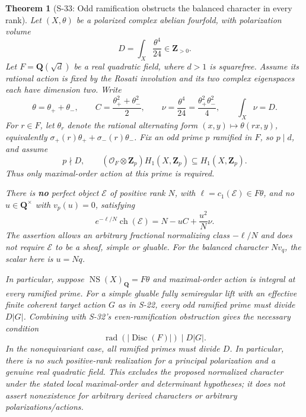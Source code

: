 \documentclass[11pt,a4paper]{article}
\newtheorem{theorem}{Theorem}[section]
\theoremstyle{definition}
\begin{document}
\begin{theorem}[S-33: Odd ramification obstructs the balanced character in every rank]
\label{thm:semireg-odd-ramification}
Let \((X,\theta)\) be a polarized complex abelian fourfold, with polarization volume \[
 D=\int_X\frac{\theta^4}{24}\in\mathbf Z_{>0}.
\] Let \(F=\mathbf Q(\sqrt d)\) be a real quadratic field, where \(d>1\) is squarefree. Assume its rational action is fixed by the Rosati involution and its two complex eigenspaces each have dimension two. Write \[
 \theta=\theta_++\theta_-,\qquad
 C=\frac{\theta_+^2+\theta_-^2}{2},\qquad
 \nu=\frac{\theta^4}{24}
      =\frac{\theta_+^2\theta_-^2}{4},\qquad \int_X\nu=D.
 \tag{S33.1}
\] For \(r\in F\), let \(\theta_r\) denote the rational alternating form \((x,y)\mapsto\theta(rx,y)\), equivalently \(\sigma_+(r)\theta_++\sigma_-(r)\theta_-\). Fix an odd prime \(p\) ramified in \(F\), so \(p\mid d\), and assume \[
 p\nmid D,\qquad
 (\mathcal O_F\otimes\mathbf Z_p)H_1(X,\mathbf Z_p)
                  \subseteq H_1(X,\mathbf Z_p).
 \tag{S33.2}
\] Thus only maximal-order action at this prime is required.

There is \textbf{no} perfect object \(\mathcal E\) of positive rank \(N\), with \(\ell=c_1(\mathcal E)\in F\theta\), and no \(u\in\mathbf Q^\times\) with \(v_p(u)=0\), satisfying \[
 e^{-\ell/N}\operatorname{ch}(\mathcal E)
       =N-uC+\frac{u^2}{N}\nu.
 \tag{S33.3}
\] The assertion allows an arbitrary fractional normalizing class \(-\ell/N\) and does not require \(\mathcal E\) to be a sheaf, simple or gluable. For the balanced character \(Nv_q\), the scalar here is \(u=Nq\).

In particular, suppose \(\operatorname{NS}(X)_{\mathbf Q}=F\theta\) and maximal-order action is integral at every ramified prime. For a simple gluable fully semiregular lift with an effective finite coherent target action \(G\) as in S-22, every odd ramified prime must divide \(D|G|\). Combining with S-32's even-ramification obstruction gives the necessary condition \[
 \operatorname{rad}(|\operatorname{Disc}(F)|)\mid D|G|.
 \tag{S33.4}
\] In the nonequivariant case, all ramified primes must divide \(D\). In particular, there is no such positive-rank realization for a principal polarization and a genuine real quadratic field. This excludes the proposed normalized character under the stated local maximal-order and determinant hypotheses; it does not assert nonexistence for arbitrary derived characters or arbitrary polarizations/actions.
\end{theorem}
\end{document}
